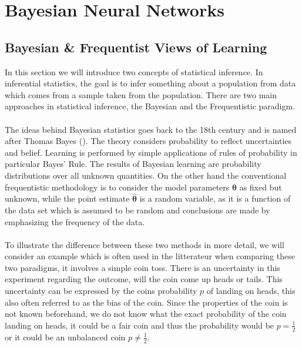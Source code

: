 \chapter{Bayesian Neural Networks}


\section{Bayesian \& Frequentist Views of Learning}\label{sec:bayesian_stat}
In this section we will introduce two concepts of statistical inference. In inferential statistics, the goal is to infer something about a population from data which comes from a sample taken from the population. There are two main approaches in statistical inference, the Bayesian and the Frequentistic paradigm.\\
\\
The ideas behind Bayesian statistics goes back to the 18th century and is named after Thomas Bayes (\cite{stigler1986history}). The theory considers probability to reflect uncertainties and belief. Learning is performed by simple applications of rules of probability in particular Bayes' Rule. The results of Bayesian learning are probability distributions over all unknown quantities. On the other hand the conventional frequentistic methodology is to consider the model parameters $\boldsymbol{\theta}$ as fixed but unknown, while the point estimate $\hat{\boldsymbol{\theta}}$ is a random variable, as it is a function of the data set which is assumed to be random and conclusions are made by emphasizing the frequency of the data.
\\
\\
To illustrate the difference between these two methods in more detail, we will consider an example which is often used in the litterateur when comparing these two paradigms, it involves a simple coin toss. There is an uncertainty in this experiment regarding the outcome, will the coin come up heads or tails. This uncertainty can be expressed by the coins probability $p$ of landing on heads, this also often referred to as the bias of the coin. Since the properties of the coin is not known beforehand, we do not know what the exact probability of the coin landing on heads, it could be a fair coin and thus the probability would be $p=\frac{1}{2}$ or it could be an unbalanced coin $p\neq \frac{1}{2}$.\\
\\
